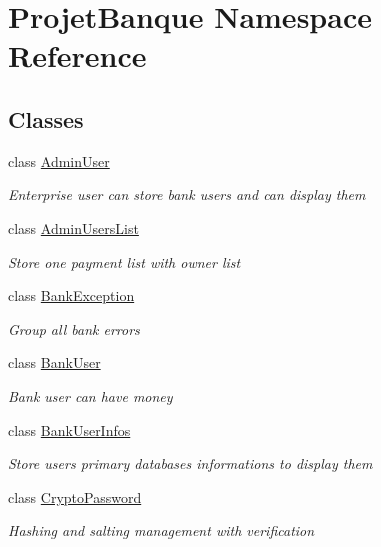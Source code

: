 \hypertarget{namespace_projet_banque}{}\section{Projet\+Banque Namespace Reference}
\label{namespace_projet_banque}
\subsection*{Classes}
\begin{DoxyCompactItemize}
\item 
class \mbox{\hyperlink{class_projet_banque_1_1_admin_user}{Admin\+User}}
\begin{DoxyCompactList}\small\item\em Enterprise user can store bank users and can display them \end{DoxyCompactList}\item 
class \mbox{\hyperlink{class_projet_banque_1_1_admin_users_list}{Admin\+Users\+List}}
\begin{DoxyCompactList}\small\item\em Store one payment list with owner list \end{DoxyCompactList}\item 
class \mbox{\hyperlink{class_projet_banque_1_1_bank_exception}{Bank\+Exception}}
\begin{DoxyCompactList}\small\item\em Group all bank errors \end{DoxyCompactList}\item 
class \mbox{\hyperlink{class_projet_banque_1_1_bank_user}{Bank\+User}}
\begin{DoxyCompactList}\small\item\em Bank user can have money \end{DoxyCompactList}\item 
class \mbox{\hyperlink{class_projet_banque_1_1_bank_user_infos}{Bank\+User\+Infos}}
\begin{DoxyCompactList}\small\item\em Store user\textquotesingle{}s primary databases informations to display them \end{DoxyCompactList}\item 
class \mbox{\hyperlink{class_projet_banque_1_1_crypto_password}{Crypto\+Password}}
\begin{DoxyCompactList}\small\item\em Hashing and salting management with verification \end{DoxyCompactList}\item 

\end{DoxyCompactItemize}
